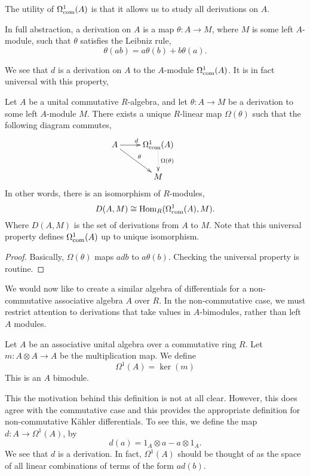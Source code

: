 The utility of $\Omega^1_{\operatorname{com}}(A)$ is that it allows us to study all
derivations on $A$. 

In full abstraction, a derivation on $A$ is a map $\theta:A\rightarrow M$, where
$M$ is some left $A$-module, such that $\theta$ satisfies the Leibniz rule,
\begin{equation*}
    \theta(ab) = a\theta(b)+b\theta(a).
\end{equation*}

We see that $d$ is a derivation on $A$ to the $A$-module $\Omega^1_{\operatorname{com}}(A)$.
It is in fact universal with this property,
\begin{theorem}
    Let $A$ be a unital commutative $R$-algebra, and let $\theta:A\rightarrow M$
    be a derivation to some left $A$-module $M$. There exists a unique $R$-linear 
    map $\Omega(\theta)$ such that the following diagram commutes,\\
    \begin{displaymath}
    \xymatrix{
        A \ar[r]^d \ar[rd]^\theta & 
        \Omega^1_{\com}(A) \ar@{.>}[d]^{\Omega(\theta)} &\\
         &
        M
    } 
  \end{displaymath}
  In other words, there is an isomorphism of $R$-modules,
  \begin{equation*}
    D(A,M) \cong \operatorname{Hom}_R(\Omega^1_{\operatorname{com}}(A),M).
  \end{equation*}
  Where $D(A,M)$ is the set of derivations from $A$ to $M$.
  Note that this universal property defines $\Omega^1_{\operatorname{com}}(A)$ up
  to unique isomorphism.
\end{theorem}
\begin{proof}
    Basically, $\Omega(\theta)$ maps $adb$ to $a\theta(b)$. Checking the universal property
    is routine.
\end{proof}

We would now like to create a similar algebra of differentials for a non-commutative
associative algebra $A$ over $R$. In the non-commutative case, we must restrict
attention to derivations that take values in $A$-bimodules, rather than left
$A$ modules.
\begin{definition}
    Let $A$ be an associative
    unital algebra over a commutative ring $R$. 
    Let $m:A\otimes A\rightarrow A$ be the multiplication map. We define
    \begin{equation*}
        \Omega^1(A) = \ker(m)
    \end{equation*}
    This is an $A$ bimodule.
\end{definition}
This the motivation behind this definition is not at all clear. However, this
does agree with the commutative case and this provides the appropriate definition
for non-commutative K\"ahler differentials. To see this, we define the map
$d:A\rightarrow \Omega^1(A)$, by
\begin{equation*}
    d(a) = 1_A\otimes a-a\otimes 1_A.
\end{equation*}
We see that $d$ is a derivation. In fact, $\Omega^1(A)$
should be thought of as the space of all linear combinations
of terms of the form $ad(b)$.


